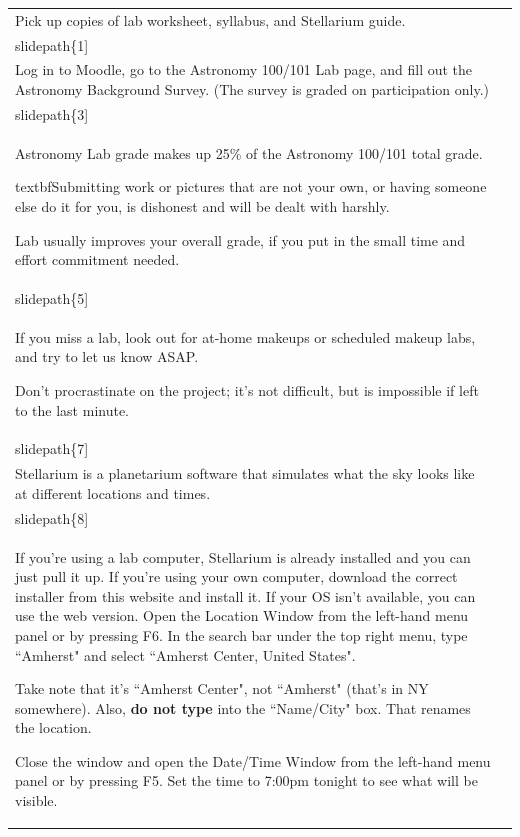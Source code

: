 \documentclass[12pt]{article}
\begin{document}
\begin{longtable}{|m{}|m{}|}\hline
Pick up copies of lab worksheet, syllabus, and Stellarium guide. & \texttt{[image: \\slidepath\{1]}}\\\hline
Log in to Moodle, go to the Astronomy 100/101 Lab page, and fill out the Astronomy Background Survey. (The survey is graded on participation only.) & \texttt{[image: \\slidepath\{3]}}\\\hline
Astronomy Lab grade makes up 25\% of the Astronomy 100/101 total grade.

textbf{Submitting work or pictures that are not your own, or having someone else do it for you, is dishonest and will be dealt with harshly.}

Lab usually improves your overall grade, if you put in the small time and effort commitment needed. & \texttt{[image: \\slidepath\{5]}}\\\hline
If you miss a lab, look out for at-home makeups or scheduled makeup labs, and try to let us know ASAP.

Don't procrastinate on the project; it's not difficult, but is impossible if left to the last minute. & \texttt{[image: \\slidepath\{7]}}\\\hline
Stellarium is a planetarium software that simulates what the sky looks like at different locations and times. & \texttt{[image: \\slidepath\{8]}}\\\hline
If you're using a lab computer, Stellarium is already installed and you can just pull it up. If you're using your own computer, download the correct installer from this website and install it. If your OS isn't available, you can use the web version. Open the Location Window from the left-hand menu panel or by pressing F6. In the search bar under the top right menu, type ``Amherst" and select ``Amherst Center, United States".

Take note that it's ``Amherst Center", not ``Amherst" (that's in NY somewhere). Also, \textbf{do not type} into the ``Name/City" box. That renames the location.

Close the window and open the Date/Time Window from the left-hand menu panel or by pressing F5. Set the time to 7:00pm tonight to see what will be visible.


\end{longtable}
\end{document}
